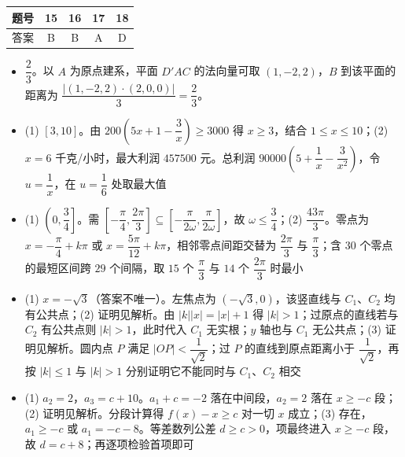 \begin{center}\begin{tabular}{ccccc}
\toprule
题号 & 15 & 16 & 17 & 18 \\
\midrule
答案 & B & B & A & D \\
\bottomrule
\end{tabular}\end{center}

\begin{itemize}[leftmargin=2.6em]
  \item[\textbf{19.}] $\dfrac23$。以 $A$ 为原点建系，平面 $D'AC$ 的法向量可取 $(1,-2,2)$，$B$ 到该平面的距离为 $\dfrac{|(1,-2,2)\cdot(2,0,0)|}{3}=\dfrac23$。
  \item[\textbf{20.}] (1) $[3,10]$。由 $200\left(5x+1-\dfrac3x\right)\geqslant3000$ 得 $x\geqslant3$，结合 $1\leqslant x\leqslant10$；(2) $x=6$ 千克/小时，最大利润 $457500$ 元。总利润 $90000\left(5+\dfrac1x-\dfrac{3}{x^2}\right)$，令 $u=\dfrac1x$，在 $u=\dfrac16$ 处取最大值
  \item[\textbf{21.}] (1) $\left(0,\dfrac34\right]$。需 $\left[-\dfrac{\pi}{4},\dfrac{2\pi}{3}\right]\subseteq\left[-\dfrac{\pi}{2\omega},\dfrac{\pi}{2\omega}\right]$，故 $\omega\leqslant\dfrac34$；(2) $\dfrac{43\pi}{3}$。零点为 $x=-\dfrac{\pi}{4}+k\pi$ 或 $x=\dfrac{5\pi}{12}+k\pi$，相邻零点间距交替为 $\dfrac{2\pi}{3}$ 与 $\dfrac{\pi}{3}$；含 $30$ 个零点的最短区间跨 $29$ 个间隔，取 $15$ 个 $\dfrac{\pi}{3}$ 与 $14$ 个 $\dfrac{2\pi}{3}$ 时最小
  \item[\textbf{22.}] (1) $x=-\sqrt3$（答案不唯一）。左焦点为 $(-\sqrt3,0)$，该竖直线与 $C_1$、$C_2$ 均有公共点；(2) 证明见解析。由 $|k||x|=|x|+1$ 得 $|k|>1$；过原点的直线若与 $C_2$ 有公共点则 $|k|>1$，此时代入 $C_1$ 无实根；$y$ 轴也与 $C_1$ 无公共点；(3) 证明见解析。圆内点 $P$ 满足 $|OP|<\dfrac1{\sqrt2}$；过 $P$ 的直线到原点距离小于 $\dfrac1{\sqrt2}$，再按 $|k|\leqslant1$ 与 $|k|>1$ 分别证明它不能同时与 $C_1$、$C_2$ 相交
  \item[\textbf{23.}] (1) $a_2=2$，$a_3=c+10$。$a_1+c=-2$ 落在中间段，$a_2=2$ 落在 $x\geqslant-c$ 段；(2) 证明见解析。分段计算得 $f(x)-x\geqslant c$ 对一切 $x$ 成立；(3) 存在，$a_1\geqslant-c$ 或 $a_1=-c-8$。等差数列公差 $d\geqslant c>0$，项最终进入 $x\geqslant-c$ 段，故 $d=c+8$；再逐项检验首项即可
\end{itemize}
